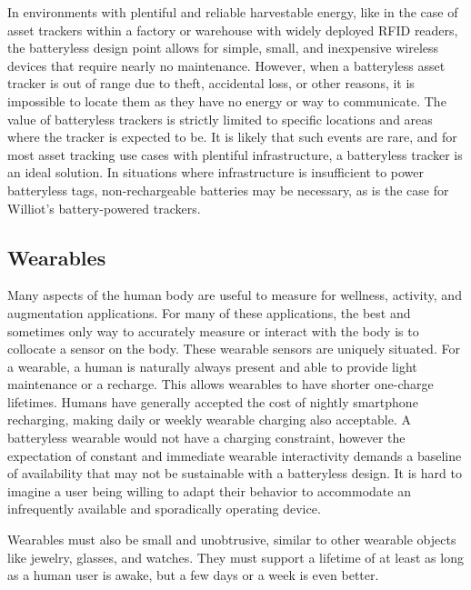 In environments with plentiful and reliable harvestable energy, like in the case of asset trackers within a factory or warehouse with widely deployed RFID readers, the batteryless design point allows for simple, small, and inexpensive wireless devices that require nearly no maintenance. 
However, when a batteryless asset tracker is out of range due to theft, accidental loss, or other reasons, it is impossible to locate them as they have no energy or way to communicate. 
The value of batteryless trackers is strictly limited to specific locations and areas where the tracker is expected to be. 
It is likely that such events are rare, and for most asset tracking use cases with plentiful infrastructure, a batteryless tracker is an ideal solution. 
In situations where infrastructure is insufficient to power batteryless tags, non-rechargeable batteries may be necessary, as is the case for Williot's battery-powered trackers.

\subsection{Wearables}

Many aspects of the human body are useful to measure for wellness, activity, and augmentation applications.
For many of these applications, the best and sometimes only way to accurately measure or interact with the body is to collocate a sensor on the body.
These wearable sensors are uniquely situated.
For a wearable, a human is naturally always present and able to provide light maintenance or a recharge. 
This allows wearables to have shorter one-charge lifetimes. 
Humans have generally accepted the cost of nightly smartphone recharging, making daily or weekly wearable charging also acceptable.
A batteryless wearable would not have a charging constraint, however
the expectation of constant and immediate wearable interactivity demands a baseline of availability that may not be sustainable with a batteryless design.
It is hard to imagine a user being willing to adapt their behavior to accommodate an infrequently available and sporadically operating device.

Wearables must also be small and unobtrusive, similar to other wearable objects like jewelry, glasses, and watches.
They must support a lifetime of at least as long as a human user is awake, but a few days or a week is even better.



